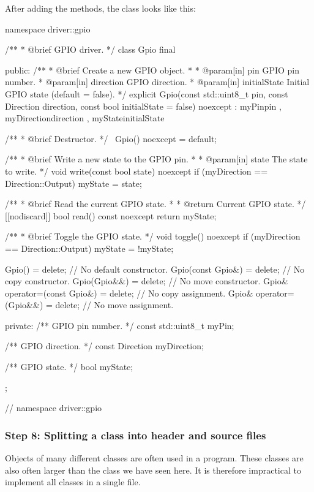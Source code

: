 \noindent After adding the methods, the class  looks like this:

\begin{cppcode}
namespace driver::gpio
{
/**
 * @brief GPIO driver.
 */
class Gpio final
{
public:
    /**
     * @brief Create a new GPIO object.
     *
     * @param[in] pin GPIO pin number.
     * @param[in] direction GPIO direction.
     * @param[in] initialState Initial GPIO state (default = false).
     */
    explicit Gpio(const std::uint8_t pin, const Direction direction,
                  const bool initialState = false) noexcept
        : myPin{pin}
        , myDirection{direction}
        , myState{initialState}
    {}

    /**
     * @brief Destructor.
     */
    ~Gpio() noexcept = default;

    /**
     * @brief Write a new state to the GPIO pin.
     *
     * @param[in] state The state to write.
     */
    void write(const bool state) noexcept
    {
        if (myDirection == Direction::Output)
        {
            myState = state;
        }
    }

    /**
     * @brief Read the current GPIO state.
     *
     * @return Current GPIO state.
     */
    [[nodiscard]] bool read() const noexcept { return myState; }

    /**
     * @brief Toggle the GPIO state.
     */
    void toggle() noexcept
    {
        if (myDirection == Direction::Output)
        {
            myState = !myState;
        }
    }

    Gpio()                       = delete; // No default constructor.
    Gpio(const Gpio&)            = delete; // No copy constructor.
    Gpio(Gpio&&)                 = delete; // No move constructor.
    Gpio& operator=(const Gpio&) = delete; // No copy assignment.
    Gpio& operator=(Gpio&&)      = delete; // No move assignment.

private:
    /** GPIO pin number. */
    const std::uint8_t myPin;

    /** GPIO direction. */
    const Direction myDirection;

    /** GPIO state. */
    bool myState;
};
} // namespace driver::gpio
\end{cppcode}

\subsubsection{Step 8: Splitting a class into header and source files}
\label{c2:sec:split}
Objects of many different classes are often used in a program. These classes are also often larger
than the class we have seen here. It is therefore impractical to implement all classes in a single
file.

